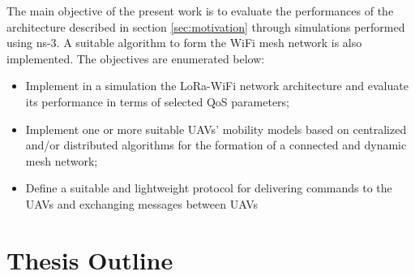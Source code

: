 The main objective of the present work is to evaluate the performances of the architecture described in section \ref{sec:motivation} through simulations performed using \gls{ns-3}. A suitable algorithm to form the WiFi mesh network is also implemented.
The objectives are enumerated below:
\begin{itemize}
	\item Implement in a simulation the LoRa-WiFi network architecture and evaluate its performance in terms of selected QoS parameters;
	\item  Implement one or more suitable \glspl{UAV}' mobility models based on centralized and/or distributed algorithms for the formation of a connected and dynamic mesh network;
	\item Define a suitable and lightweight protocol for delivering commands to the \glspl{UAV} and exchanging messages between \glspl{UAV}  
\end{itemize}

\section{Thesis Outline}




%
%
%
%
